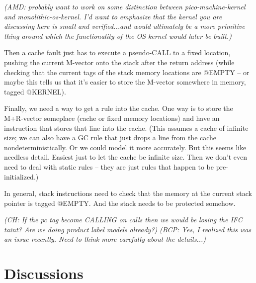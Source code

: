\documentclass{article}
\newcommand{\bcp}[1]{{\color{blue}\em (BCP: #1)}}
\newcommand{\amd}[1]{{\color{purple}\em (AMD: #1)}}
\newcommand{\ch}[1]{{\color{dkblue}\em (CH: #1)}}
\begin{document}
\amd{probably want to work on some distinction between pico-machine-kernel
  and monolithic-os-kernel.  I'd want to emphasize that the kernel you are
  discussing here is small and verified...and would ultimately be a more
  primitive thing around which the functionality of the OS kernel would later
  be built.}

Then a cache fault just has to execute a pseudo-CALL to a fixed location,
pushing the current M-vector onto the stack after the return address (while
checking that the current tags of the stack memory locations are @EMPTY --
or maybe this tells us that it's easier to store the M-vector somewhere in
memory, tagged @KERNEL).

Finally, we need a way to get a rule into the cache.  One way is to store
the M+R-vector someplace (cache or fixed memory locations) and have an
instruction that stores that line into the cache.  (This assumes a cache of
infinite size; we can also have a GC rule that just drops a line from the
cache nondeterministically.  Or we could model it more accurately.  But this
seems like needless detail.  Easiest just to let the cache be infinite
size.  Then we don't even need to deal with static rules -- they are just
rules that happen to be pre-initialized.) 

In general, stack instructions need to check that the memory at the current 
stack pointer is tagged @EMPTY.  And the stack needs to be protected
somehow. 

\ch{If the pc tag become CALLING on calls then we would be losing the
  IFC taint? Are we doing product label models already?}
\bcp{Yes, I realized this was an issue recently.  Need to think more
  carefully about the details...}

\section{Discussions}
\end{document}
